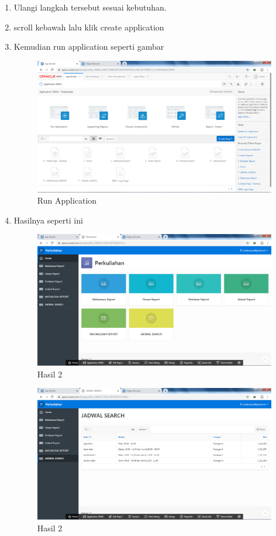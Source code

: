 \begin{enumerate}
\item Ulangi langkah tersebut sesuai kebutuhan.

\item scroll kebawah lalu klik create application

\item Kemudian run application seperti gambar
\begin{figure}[H]
\centering
\caption{Run Application}
\includegraphics[width=1\textwidth]{figures/18.png}
\end{figure}

\item Hasilnya seperti ini
\begin{figure}[H]
\centering
\caption{Hasil 2}
\includegraphics[width=1\textwidth]{figures/19.png}
\end{figure}

\begin{figure}[H]
\centering
\caption{Hasil 2}
\includegraphics[width=1\textwidth]{figures/20.png}
\end{figure}

\end{enumerate}